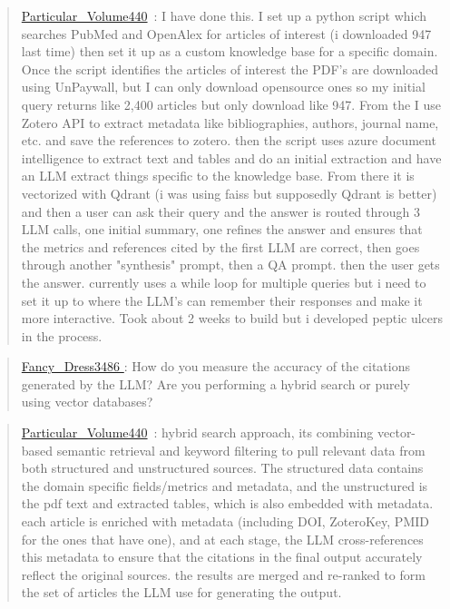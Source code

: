 \documentclass[a4paper,11pt]{report}
\begin{document}
\begin{quote}
\href{https://www.reddit.com/user/Particular_Volume440/}{Particular\_Volume440}~: I have done this. I set up a python script which searches PubMed and OpenAlex for articles of interest (i downloaded 947 last time) then set it up as a custom knowledge base for a specific domain. Once the script identifies the articles of interest the PDF's are downloaded using UnPaywall, but I can only download opensource ones so my initial query returns like 2,400 articles but only download like 947. From the I use Zotero API to extract metadata like bibliographies, authors, journal name, etc. and save the references to zotero. then the script uses azure document intelligence to extract text and tables and do an initial extraction and have an LLM extract things specific to the knowledge base. From there it is vectorized with Qdrant (i was using faiss but supposedly Qdrant is better) and then a user can ask their query and the answer is routed through 3 LLM calls, one initial summary, one refines the answer and ensures that the metrics and references cited by the first LLM are correct, then goes through another "synthesis" prompt, then a QA prompt. then the user gets the answer. currently uses a while loop for multiple queries but i need to set it up to where the LLM's can remember their responses and make it more interactive. Took about 2 weeks to build but i developed peptic ulcers in the process.
\end{quote}

\begin{quote}
\href{https://www.reddit.com/user/Fancy_Dress3486/}{Fancy\_Dress3486 }: How do you measure the accuracy of the citations generated by the LLM? Are you performing a hybrid search or purely using vector databases?
\end{quote}

\begin{quote}
\href{https://www.reddit.com/user/Particular_Volume440/}{Particular\_Volume440}~: hybrid search approach, its combining vector-based semantic retrieval and keyword filtering to pull relevant data from both structured and unstructured sources. The structured data contains the domain specific fields/metrics and metadata, and the unstructured is the pdf text and extracted tables, which is also embedded with metadata. each article is enriched with metadata (including DOI, ZoteroKey, PMID for the ones that have one), and at each stage, the LLM cross-references this metadata to ensure that the citations in the final output accurately reflect the original sources. the results are merged and re-ranked to form the set of articles the LLM use for generating the output.
\end{quote}
\end{document}

